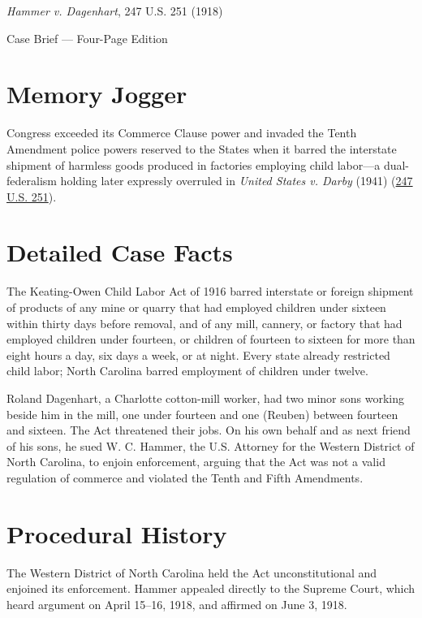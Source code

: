 \documentclass[12pt]{article}
\begin{document}
\begin{center}
{\LARGE \textit{Hammer v. Dagenhart}, 247 U.S. 251 (1918)\par}
\vspace{0.8em}
{\large Case Brief --- Four-Page Edition\par}
\end{center}
\vspace{1em}

\section{Memory Jogger}

Congress exceeded its Commerce Clause power and invaded the Tenth Amendment police powers reserved to the States when it barred the interstate shipment of harmless goods produced in factories employing child labor---a dual-federalism holding later expressly overruled in \textit{United States v. Darby} (1941) (\href{https://supreme.justia.com/cases/federal/us/247/251/}{247 U.S. 251}).

\section{Detailed Case Facts}

The Keating-Owen Child Labor Act of 1916 barred interstate or foreign shipment of products of any mine or quarry that had employed children under sixteen within thirty days before removal, and of any mill, cannery, or factory that had employed children under fourteen, or children of fourteen to sixteen for more than eight hours a day, six days a week, or at night. Every state already restricted child labor; North Carolina barred employment of children under twelve.

Roland Dagenhart, a Charlotte cotton-mill worker, had two minor sons working beside him in the mill, one under fourteen and one (Reuben) between fourteen and sixteen. The Act threatened their jobs. On his own behalf and as next friend of his sons, he sued W. C. Hammer, the U.S. Attorney for the Western District of North Carolina, to enjoin enforcement, arguing that the Act was not a valid regulation of commerce and violated the Tenth and Fifth Amendments.

\section{Procedural History}

The Western District of North Carolina held the Act unconstitutional and enjoined its enforcement. Hammer appealed directly to the Supreme Court, which heard argument on April 15--16, 1918, and affirmed on June 3, 1918.
\end{document}
